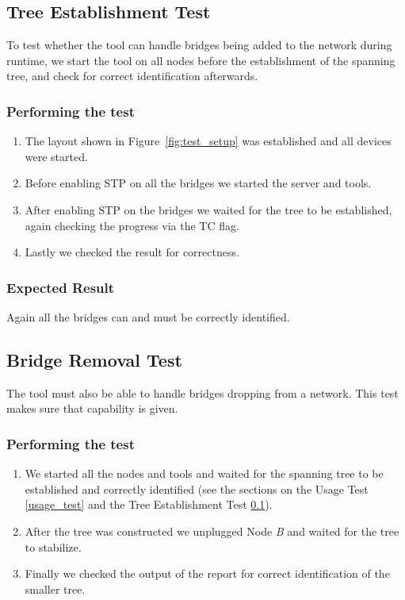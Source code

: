 \subsection{Tree Establishment Test}
\label{tree_est_test}
To test whether the tool can handle bridges being added to the network during runtime, we start the tool on all nodes before the establishment of the spanning tree, and check for correct identification afterwards.

\subsubsection{Performing the test}
\begin{enumerate}
    \item The layout shown in Figure~\ref{fig:test_setup} was established and all devices were started.
    \item Before enabling STP on all the bridges we started the server and tools.
    \item After enabling STP on the bridges we waited for the tree to be established, again checking the progress via the TC flag.
    \item Lastly we checked the result for correctness.
\end{enumerate}

\subsubsection{Expected Result}
Again all the bridges can and must be correctly identified.

\subsection{Bridge Removal Test}
\label{removal_test}
The tool must also be able to handle bridges dropping from a network.
This test makes sure that capability is given.

\subsubsection{Performing the test}
\begin{enumerate}
    \item We started all the nodes and tools and waited for the spanning tree to be established and correctly identified (see the sections on the Usage Test \ref{usage_test} and the Tree Establishment Test \ref{tree_est_test}).
    \item After the tree was constructed we unplugged Node \textit{B} and waited for the tree to stabilize.
    \item Finally we checked the output of the report for correct identification of the smaller tree.
\end{enumerate}

